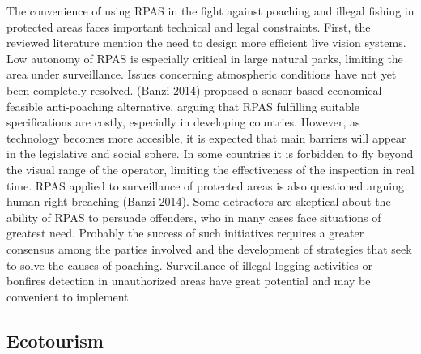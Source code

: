 \documentclass[]{interact}
\theoremstyle{plain}%
\theoremstyle{definition}
\theoremstyle{remark}
\begin{document}
The convenience of using RPAS in the fight against poaching and illegal
fishing in protected areas faces important technical and legal
constraints. First, the reviewed literature mention the need to design
more efficient live vision systems. Low autonomy of RPAS is especially
critical in large natural parks, limiting the area under surveillance.
Issues concerning atmospheric conditions have not yet been completely
resolved. (Banzi 2014) proposed a sensor based economical feasible
anti-poaching alternative, arguing that RPAS fulfilling suitable
specifications are costly, especially in developing countries. However,
as technology becomes more accesible, it is expected that main barriers
will appear in the legislative and social sphere. In some countries it
is forbidden to fly beyond the visual range of the operator, limiting
the effectiveness of the inspection in real time. RPAS applied to
surveillance of protected areas is also questioned arguing human right
breaching (Banzi 2014). Some detractors are skeptical about the ability
of RPAS to persuade offenders, who in many cases face situations of
greatest need. Probably the success of such initiatives requires a
greater consensus among the parties involved and the development of
strategies that seek to solve the causes of poaching. Surveillance of
illegal logging activities or bonfires detection in unauthorized areas
have great potential and may be convenient to implement.

\subsection{Ecotourism}\label{ecotourism-1}
\end{document}
